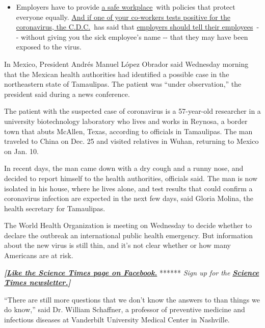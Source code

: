 \begin{itemize}
  \begin{itemize}
  \tightlist
  \item
    Employers have to provide
    \href{https://www.osha.gov/SLTC/covid-19/standards.html}{a safe
    workplace}~with policies that protect everyone equally.
    \href{https://www.nytimes3xbfgragh.onion/article/coronavirus-money-unemployment.html?action=click\&pgtype=Article\&state=default\&region=MAIN_CONTENT_3\&context=storylines_faq}{And
    if one of your co-workers tests positive for the coronavirus, the
    C.D.C.}~has said that
    \href{https://www.cdc.gov/coronavirus/2019-ncov/community/guidance-business-response.html}{employers
    should tell their employees}~-\/- without giving you the sick
    employee's name -\/- that they may have been exposed to the virus.
  \end{itemize}
\end{itemize}

In Mexico, President Andrés Manuel López Obrador said Wednesday morning
that the Mexican health authorities had identified a possible case in
the northeastern state of Tamaulipas. The patient was ``under
observation,'' the president said during a news conference.

The patient with the suspected case of coronavirus is a 57-year-old
researcher in a university biotechnology laboratory who lives and works
in Reynosa, a border town that abuts McAllen, Texas, according to
officials in Tamaulipas. The man traveled to China on Dec. 25 and
visited relatives in Wuhan, returning to Mexico on Jan. 10.

In recent days, the man came down with a dry cough and a runny nose, and
decided to report himself to the health authorities, officials said. The
man is now isolated in his house, where he lives alone, and test results
that could confirm a coronavirus infection are expected in the next few
days, said Gloria Molina, the health secretary for Tamaulipas.

The World Health Organization is meeting on Wednesday to decide whether
to declare the outbreak an international public health emergency. But
information about the new virus is still thin, and it's not clear
whether or how many Americans are at risk.

\textbf{\emph{{[}}\href{http://on.fb.me/1paTQ1h}{\emph{Like the Science
Times page on Facebook.}}} ****** \emph{\textbar{} Sign up for the}
\textbf{\href{http://nyti.ms/1MbHaRU}{\emph{Science Times
newsletter.}}\emph{{]}}}

``There are still more questions that we don't know the answers to than
things we do know,'' said Dr. William Schaffner, a professor of
preventive medicine and infectious diseases at Vanderbilt University
Medical Center in Nashville.

